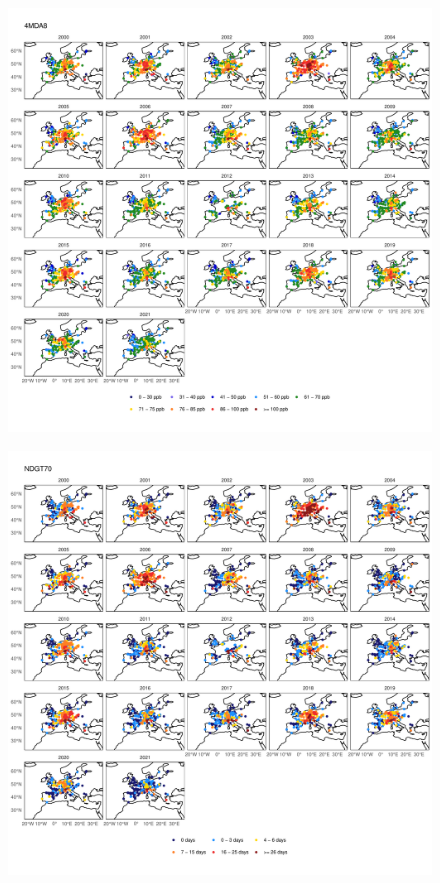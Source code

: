 \documentclass{article}
\begin{document}
\begin{figure}
\centering
\includegraphics[height=0.9\textheight]{figures/si_figures/fS09_metric_map_Europe_4MDA8.pdf}
\caption{}
\label{si_fig:metric_map_eu_4MDA8}
\end{figure}
\clearpage

\begin{figure}
\centering
\includegraphics[height=0.9\textheight]{figures/si_figures/fS10_metric_map_Europe_NDGT70.pdf}
\caption{}
\label{si_fig:metric_map_eu_NDGT70}
\end{figure}
\clearpage
\end{document}
